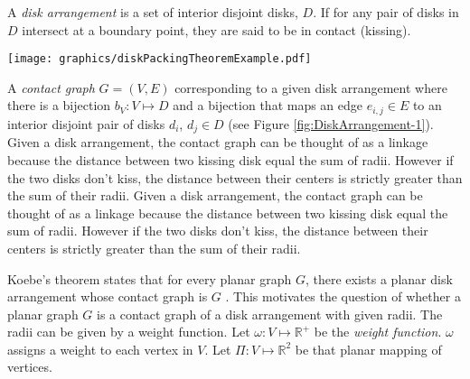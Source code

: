 \documentclass[10pt]{CSUNthesis}
\theoremstyle{plain}%
\theoremstyle{definition}
\theoremstyle{remark}
\newcommand{\bbR}{{\mathbb{R}}}
\newcommand{\bbr}{{\mathbb{R}}}
\begin{document}
 A \textit{disk arrangement} is a set of interior disjoint disks, $D$.  
 If for any pair of disks in $D$ intersect at a boundary point, they are said to be in contact (kissing).

\begin{minipage}{\linewidth}
\texttt{[image: graphics/diskPackingTheoremExample.pdf]}
\label{fig:DiskArrangement-1}
\end{minipage}

A \textit{contact graph} $G=(V,E)$ corresponding to a given disk arrangement where there is a bijection $b_V: V \mapsto D$ and a bijection that maps an edge $e_{i,j} \in E$ to an interior disjoint pair of disks $d_i$, $d_j \in D$ (see Figure \ref{fig:DiskArrangement-1}).
Given a disk arrangement, the contact graph can be thought of as a linkage because the distance between two kissing disk equal the sum of radii.  
However if the two disks don't kiss, the distance between their centers is strictly greater than the sum of their radii.
Given a disk arrangement, the contact graph can be thought of as a linkage because the distance between two kissing disk equal the sum of radii.  
However if the two disks don't kiss, the distance between their centers is strictly greater than the sum of their radii.

Koebe's theorem states that for every planar graph $G$, there exists a planar disk arrangement whose contact graph is $G$ \cite{koebe1936kontaktprobleme}.
This motivates the question of whether a planar graph $G$ is a contact graph of a disk arrangement with given radii.
The radii can be given by a weight function.
Let $\omega: V \mapsto \bbR^+$ be the \textit{weight function}.  
$\omega$ assigns a weight to each vertex in $V$.  
Let $\Pi:V \mapsto \bbr^2$ be that planar mapping of vertices.
\end{document}
